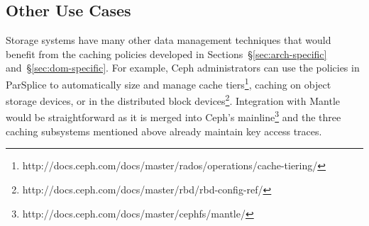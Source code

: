 %

\subsection{Other Use Cases}

Storage systems have many other data management techniques that would benefit
from the caching policies developed in Sections~\S\ref{sec:arch-specific}
and~\S\ref{sec:dom-specific}. For example, Ceph administrators can use the
policies in ParSplice to automatically size and manage cache
tiers\footnote{http://docs.ceph.com/docs/master/rados/operations/cache-tiering/},
caching on object storage devices, or in the distributed block
devices\footnote{http://docs.ceph.com/docs/master/rbd/rbd-config-ref/}.
Integration with Mantle would be straightforward as it is merged into Ceph's
mainline\footnote{http://docs.ceph.com/docs/master/cephfs/mantle/} and the
three caching subsystems mentioned above already maintain key access traces. 

